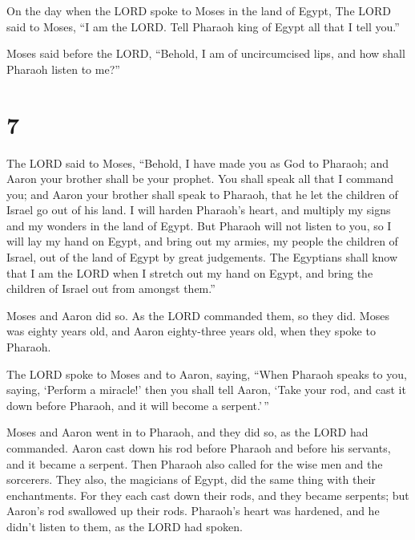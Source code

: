  On the day when the LORD spoke to Moses in the land of
Egypt,  The LORD said to Moses, ``I am the LORD. Tell
Pharaoh king of Egypt all that I tell you.''

 Moses said before the LORD, ``Behold, I am of
uncircumcised lips, and how shall Pharaoh listen to me?''

\hypertarget{section-6}{%
\section{7}\label{section-6}}

 The LORD said to Moses, ``Behold, I have made you as God
to Pharaoh; and Aaron your brother shall be your prophet. 
You shall speak all that I command you; and Aaron your brother shall
speak to Pharaoh, that he let the children of Israel go out of his land.
 I will harden Pharaoh's heart, and multiply my signs and
my wonders in the land of Egypt.  But Pharaoh will not
listen to you, so I will lay my hand on Egypt, and bring out my armies,
my people the children of Israel, out of the land of Egypt by great
judgements.  The Egyptians shall know that I am the LORD
when I stretch out my hand on Egypt, and bring the children of Israel
out from amongst them.''

 Moses and Aaron did so. As the LORD commanded them, so
they did.  Moses was eighty years old, and Aaron
eighty-three years old, when they spoke to Pharaoh.

 The LORD spoke to Moses and to Aaron, saying,
 ``When Pharaoh speaks to you, saying, `Perform a
miracle!' then you shall tell Aaron, `Take your rod, and cast it down
before Pharaoh, and it will become a serpent.'\,''

 Moses and Aaron went in to Pharaoh, and they did so, as
the LORD had commanded. Aaron cast down his rod before Pharaoh and
before his servants, and it became a serpent.  Then
Pharaoh also called for the wise men and the sorcerers. They also, the
magicians of Egypt, did the same thing with their enchantments.
 For they each cast down their rods, and they became
serpents; but Aaron's rod swallowed up their rods. 
Pharaoh's heart was hardened, and he didn't listen to them, as the LORD
had spoken.

